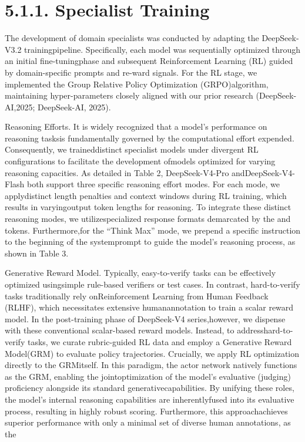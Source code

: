\documentclass[
  10
]{article}
\begin{document}
\section{5.1.1. Specialist Training}\label{specialist-training}

The development of domain specialists was conducted by adapting the
DeepSeek-V3.2 trainingpipeline. Specifically, each model was
sequentially optimized through an initial fine-tuningphase and
subsequent Reinforcement Learning (RL) guided by domain-specific prompts
and re-ward signals. For the RL stage, we implemented the Group Relative
Policy Optimization (GRPO)algorithm, maintaining hyper-parameters
closely aligned with our prior research (DeepSeek-AI,2025; DeepSeek-AI,
2025).

Reasoning Efforts. It is widely recognized that a model's performance on
reasoning tasksis fundamentally governed by the computational effort
expended. Consequently, we traineddistinct specialist models under
divergent RL configurations to facilitate the development ofmodels
optimized for varying reasoning capacities. As detailed in Table 2,
DeepSeek-V4-Pro andDeepSeek-V4-Flash both support three specific
reasoning effort modes. For each mode, we applydistinct length penalties
and context windows during RL training, which results in varyingoutput
token lengths for reasoning. To integrate these distinct reasoning
modes, we utilizespecialized response formats demarcated by the and
tokens. Furthermore,for the ``Think Max'' mode, we prepend a specific
instruction to the beginning of the systemprompt to guide the model's
reasoning process, as shown in Table 3.

Generative Reward Model. Typically, easy-to-verify tasks can be
effectively optimized usingsimple rule-based verifiers or test cases. In
contrast, hard-to-verify tasks traditionally rely onReinforcement
Learning from Human Feedback (RLHF), which necessitates extensive
humanannotation to train a scalar reward model. In the post-training
phase of DeepSeek-V4 series,however, we dispense with these conventional
scalar-based reward models. Instead, to addresshard-to-verify tasks, we
curate rubric-guided RL data and employ a Generative Reward Model(GRM)
to evaluate policy trajectories. Crucially, we apply RL optimization
directly to the GRMitself. In this paradigm, the actor network natively
functions as the GRM, enabling the jointoptimization of the model's
evaluative (judging) proficiency alongside its standard
generativecapabilities. By unifying these roles, the model's internal
reasoning capabilities are inherentlyfused into its evaluative process,
resulting in highly robust scoring. Furthermore, this approachachieves
superior performance with only a minimal set of diverse human
annotations, as the
\end{document}
